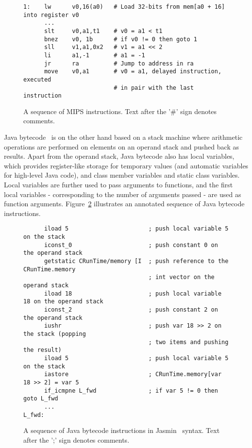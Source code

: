 \begin{figure}[htb]
  \centering
  \footnotesize
\begin{verbatim}
1:    lw      v0,16(a0)   # Load 32-bits from mem[a0 + 16] into register v0
      ...
      slt     v0,a1,t1    # v0 = a1 < t1
      bnez    v0, 1b      # if v0 != 0 then goto 1
      sll     v1,a1,0x2   # v1 = a1 << 2
      li      a1,-1       # a1 = -1
      jr      ra          # Jump to address in ra
      move    v0,a1       # v0 = a1, delayed instruction, executed
                          # in pair with the last instruction
\end{verbatim}
  \caption[Sequence of MIPS instructions]{A sequence of MIPS instructions.
    Text after the '\#' sign denotes comments.}
  \label{fig:intro:mips}
\end{figure}

Java bytecode~\cite{lindholm99jvm} is on the other hand based on a stack
machine where arithmetic operations are performed on elements on an operand
stack and pushed back as results. Apart from the operand stack, Java bytecode
also has local variables, which provides register-like storage for temporary
values (and automatic variables for high-level Java code), and class member
variables and static class variables. Local variables are further used to pass
arguments to functions, and the first local variables - corresponding to the
number of arguments passed - are used as function arguments.
Figure~\ref{fig:intro:jbc} illustrates an annotated sequence of Java bytecode
instructions.

\begin{figure}[htb]
  \centering
  \footnotesize
\begin{verbatim}
      iload 5                       ; push local variable 5 on the stack
      iconst_0                      ; push constant 0 on the operand stack
      getstatic CRunTime/memory [I  ; push reference to the CRunTime.memory
                                    ; int vector on the operand stack
      iload 18                      ; push local variable 18 on the operand stack
      iconst_2                      ; push constant 2 on the operand stack
      iushr                         ; push var 18 >> 2 on the stack (popping
                                    ; two items and pushing the result)
      iload 5                       ; push local variable 5 on the stack
      iastore                       ; CRunTime.memory[var 18 >> 2] = var 5
      if_icmpne L_fwd               ; if var 5 != 0 then goto L_fwd
      ...
L_fwd:
\end{verbatim}
  \caption[Sequence of Java bytecode instructions]{A sequence of Java bytecode
    instructions in Jasmin~\cite{jasmin} syntax. Text after the ';' sign
    denotes comments.}
  \label{fig:intro:jbc}
\end{figure}

